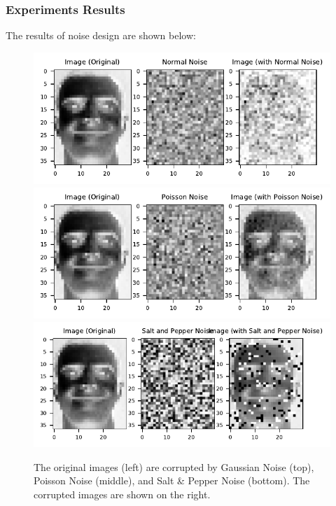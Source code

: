 \subsubsection{Experiments Results}
The results of noise design are shown below:
\begin{figure}\label{noises}
	\centering
	\includegraphics[scale=.8]{Noise_ORL_Normal_Comparison}\\ %
	\includegraphics[scale=.8]{Noise_ORL_Poisson_Comparison}\\
	\includegraphics[scale=.8]{Noise_ORL_Salt_and_Pepper_Comparison}
	\caption{The original images (left) are corrupted by Gaussian Noise (top), Poisson Noise (middle), and Salt \& Pepper Noise (bottom). The corrupted images are shown on the right.}
	\label{fig:noise}
\end{figure}
